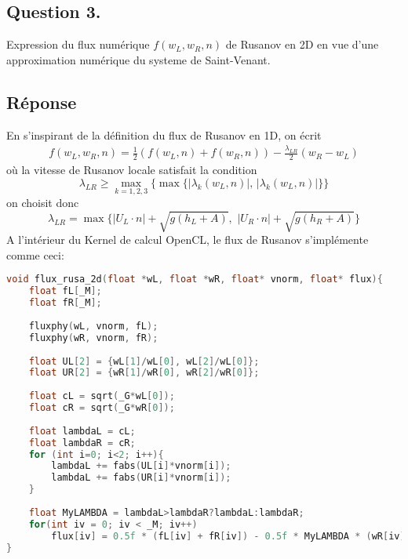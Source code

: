 \documentclass[
	french,
	11pt, %
]{fphw}
\begin{document}
\subsection*{Question 3.}

\begin{problem}
	Expression du flux numérique $f(w_L, w_R, n)$ de Rusanov en 2D en vue d'une approximation numérique du systeme de Saint-Venant.
\end{problem}


\subsection*{Réponse} 
En s'inspirant de la définition du flux de Rusanov en 1D, on écrit
\begin{align*}
	f(w_L, w_R, n) = \frac{1}{2}\left( f(w_L,n)+f(w_R,n)  \right) - \frac{\lambda_{LR}}{2}(w_R - w_L)
\end{align*}
où la vitesse de Rusanov locale satisfait la condition 
$$
\lambda_{LR} \geq \max_{k=1,2,3}{\big\{ \max{ \big\{ \vert \lambda_k(w_L,n) \vert, \, \vert \lambda_k(w_L,n) \vert }\big\} \big\}}
$$
on choisit donc 
$$
\lambda_{LR} = \max{ \Big\{ \vert U_L\cdot n \vert + \sqrt{g(h_L+A)}, \,\, \vert U_R\cdot n \vert + \sqrt{g(h_R+A)} }\Big\}
$$
A l'intérieur du Kernel de calcul OpenCL, le flux de Rusanov s'implémente comme ceci:
\begin{lstlisting}[language=C, caption={Flux numérique de Rusanov en 2D},breaklines]
void flux_rusa_2d(float *wL, float *wR, float* vnorm, float* flux){
	float fL[_M];
	float fR[_M];
	
	fluxphy(wL, vnorm, fL);
	fluxphy(wR, vnorm, fR);
	
	float UL[2] = {wL[1]/wL[0], wL[2]/wL[0]};
	float UR[2] = {wR[1]/wR[0], wR[2]/wR[0]};
	
	float cL = sqrt(_G*wL[0]);
	float cR = sqrt(_G*wR[0]);
	
	float lambdaL = cL;
	float lambdaR = cR;
	for (int i=0; i<2; i++){
		lambdaL += fabs(UL[i]*vnorm[i]);
		lambdaL += fabs(UR[i]*vnorm[i]);
	}
	
	float MyLAMBDA = lambdaL>lambdaR?lambdaL:lambdaR;
	for(int iv = 0; iv < _M; iv++)
		flux[iv] = 0.5f * (fL[iv] + fR[iv]) - 0.5f * MyLAMBDA * (wR[iv] - wL[iv]); 
}
\end{lstlisting}



\end{document}
